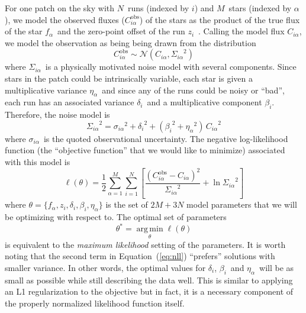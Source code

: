 \documentclass[12pt,preprint]{aastex}
\newcommand{\Eq}[1]{Equation~(\ref{eq:#1})}
\newcommand{\eq}[1]{\Eq{#1}}
\newcommand{\eqlabel}[1]{\label{eq:#1}}
\newcommand{\normal}[1]{\ensuremath{\mathcal{N} \left (#1\right )}}
\newcommand{\nstars}{\ensuremath{M}}
\newcommand{\nobs}  {\ensuremath{N}}
\newcommand{\st}    {\ensuremath{\alpha}}
\newcommand{\obs}   {\ensuremath{i}}
\newcommand{\jabs}  {\ensuremath{\delta_\obs}}
\newcommand{\vs}    {\ensuremath{\eta_\st}}
\newcommand{\vo}    {\ensuremath{\beta_\obs}}
\newcommand{\sigobs}{\ensuremath{\sigma_{\obs\st}}}
\newcommand{\sig}   {\ensuremath{\Sigma_{\obs\st}}}
\newcommand{\fstar} {\ensuremath{f_\st}}
\newcommand{\fobs}  {\ensuremath{z_\obs}}
\newcommand{\Cobs}  {\ensuremath{C_{\obs\st}^\mathrm{obs}}}
\newcommand{\Cmod}  {\ensuremath{C_{\obs\st}}}
\begin{document}
For one patch on the sky with \nobs\ runs (indexed by \obs ) and \nstars\
stars (indexed by \st ), we model the observed fluxes (\Cobs ) of the
stars as the product of the true flux of the star \fstar\ and the zero-point
offset of the run \fobs\ . Calling the model flux \Cmod , we model the
observation as being being drawn from the distribution
\begin{equation}
    \Cobs \sim \normal{\Cmod, \sig^2}
\end{equation}
where \sig\ is a physically motivated noise model with several components.
Since stars in the patch could be intrinsically variable, each star is
given a multiplicative variance \vs\ and since any of the runs could be
noisy or ``bad'', each run has an associated variance \jabs\ and a
multiplicative component \vo . Therefore, the
noise model is
\begin{equation}
    \sig^2 = \sigobs^2 + \jabs^2 + \left ( \vo^2 + \vs^2 \right ) \, \Cmod^2
\end{equation}
where \sigobs\ is the quoted observational uncertainty. The negative
log-likelihood function (the ``objective function'' that we would like to
minimize) associated with this model is
\begin{equation}\eqlabel{nll}
    \ell (\theta) = \frac{1}{2} \sum_{\st=1}^\nstars \sum_{\obs=1}^\nobs
        \left [
            \frac{(\Cobs - \Cmod)^2}{\sig^2} + \ln \sig^2
        \right ]
\end{equation}
where $\theta = \{ \fstar, \fobs, \jabs, \vo, \vs \}$ is the set of
$2\nstars + 3\nobs$ model parameters that we will be optimizing with
respect to. The
optimal set of parameters
\begin{equation}
    \theta^* = \operatorname*{arg\,min}_\theta \ell (\theta)
\end{equation}
is equivalent to the \emph{maximum likelihood} setting of the parameters.
It is worth noting that the second term in \eq{nll} ``prefers'' solutions
with smaller variance. In other words, the optimal values for \jabs , \vo\
and \vs\ will be as small as possible while still describing the data well.
This is similar to applying an L1 regularization to the objective but in
fact, it is a necessary component of the properly normalized likelihood
function itself.
\end{document}
